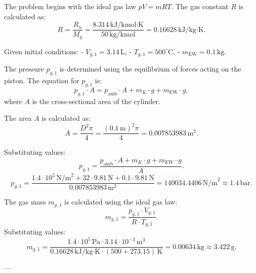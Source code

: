 The problem begins with the ideal gas law \( pV = mRT \). The gas constant \( R \) is calculated as:  
\[
R = \frac{R_u}{M_g} = \frac{8.314 \, \text{kJ/kmol·K}}{50 \, \text{kg/kmol}} = 0.16628 \, \text{kJ/kg·K}.
\]  

Given initial conditions:  
- \( V_{g,1} = 3.14 \, \text{L} \),  
- \( T_{g,1} = 500^\circ\text{C} \),  
- \( m_{\text{EW}} = 0.1 \, \text{kg} \).  

The pressure \( p_{g,1} \) is determined using the equilibrium of forces acting on the piston. The equation for \( p_{g,1} \) is:  
\[
p_{g,1} \cdot A = p_{\text{amb}} \cdot A + m_K \cdot g + m_{\text{EW}} \cdot g,
\]  
where \( A \) is the cross-sectional area of the cylinder.  

The area \( A \) is calculated as:  
\[
A = \frac{D^2 \pi}{4} = \frac{(0.1 \, \text{m})^2 \pi}{4} = 0.007853983 \, \text{m}^2.
\]  

Substituting values:  
\[
p_{g,1} = \frac{p_{\text{amb}} \cdot A + m_K \cdot g + m_{\text{EW}} \cdot g}{A}.
\]  
\[
p_{g,1} = \frac{1.4 \cdot 10^5 \, \text{N/m}^2 + 32 \cdot 9.81 \, \text{N} + 0.1 \cdot 9.81 \, \text{N}}{0.007853983 \, \text{m}^2} = 140034.4406 \, \text{N/m}^2 \approx 1.4 \, \text{bar}.
\]  

The gas mass \( m_{g,1} \) is calculated using the ideal gas law:  
\[
m_{g,1} = \frac{p_{g,1} \cdot V_{g,1}}{R \cdot T_{g,1}}.
\]  
Substituting values:  
\[
m_{g,1} = \frac{1.4 \cdot 10^5 \, \text{Pa} \cdot 3.14 \cdot 10^{-3} \, \text{m}^3}{0.16628 \, \text{kJ/kg·K} \cdot (500 + 273.15) \, \text{K}} = 0.00634 \, \text{kg} \approx 3.422 \, \text{g}.
\]  

---